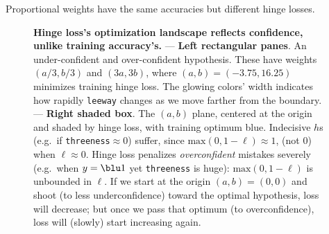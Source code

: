 


  Proportional weights have the same accuracies but different hinge losses.
  \begin{figure}[h]
    \centering
    \hspace{0.22cm}%
    \hspace{0.22cm}%
    \caption{%
          \textbf{Hinge loss's optimization landscape reflects confidence, unlike
          training accuracy's.}
          --- \textbf{Left rectangular panes}.  An under-confident and
          over-confident hypothesis.  These have weights
          $(a/3, b/3)$ and $(3a, 3b)$, where
          $(a,b)=(-3.75,16.25)$ minimizes training hinge loss.  The glowing
          colors' width indicates how rapidly \texttt{leeway} changes as we
          move farther from the boundary.
          --- \textbf{Right shaded box}.  The $(a,b)$ plane, centered at the
          origin and shaded by hinge loss, with training optimum {\blu blue}.
          Indecisive $h$s (e.g.\ if
          \texttt{threeness}$\approx 0$) suffer, since $\text{max}(0,1-\ell)\approx
          1$, (not $0$) when $\ell\approx 0$.
          Hinge loss penalizes \emph{overconfident} mistakes severely (e.g.\
          when $y={\blu 1}$ yet \texttt{threeness} is huge):
          $\text{max}(0,1-\ell)$ is unbounded in $\ell$.
          If we start at the origin $(a,b)=(0,0)$ and shoot (to less
          underconfidence) toward the optimal hypothesis, loss will
          decrease; but once we pass that optimum (to overconfidence),
          loss will (slowly) start increasing again.
    }
  \end{figure}





